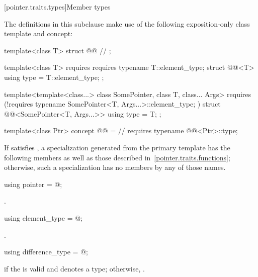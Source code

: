 [pointer.traits.types]{Member types}

\pnum
The definitions in this subclause make use of
the following exposition-only class template and concept:
\begin{codeblock}
template<class T>
struct @@          // \expos
{ };

template<class T> requires requires { typename T::element_type; }
struct @@<T>
{ using type = T::element_type; };

template<template<class...> class SomePointer, class T, class... Args>
  requires (!requires { typename SomePointer<T, Args...>::element_type; })
struct @@<SomePointer<T, Args...>>
{ using type = T; };

template<class Ptr>
  concept @@ =       // \expos
    requires { typename @@<Ptr>::type; }
\end{codeblock}

\pnum
If  satisfies ,
a specialization 
generated from the  primary template
has the following members
as well as those described in~\ref{pointer.traits.functions};
otherwise, such a specialization has no members by any of those names.

%
\begin{itemdecl}
using pointer = @\seebelow@;
\end{itemdecl}

\begin{itemdescr}
\pnum
\ctype {}.
\end{itemdescr}

%
\begin{itemdecl}
using element_type = @\seebelow@;
\end{itemdecl}

\begin{itemdescr}
\pnum
\ctype {}.
\end{itemdescr}

%
\begin{itemdecl}
using difference_type = @\seebelow@;
\end{itemdecl}

\begin{itemdescr}
\pnum
\ctype {} if
the   is valid and denotes a
type; otherwise,
.
\end{itemdescr}

